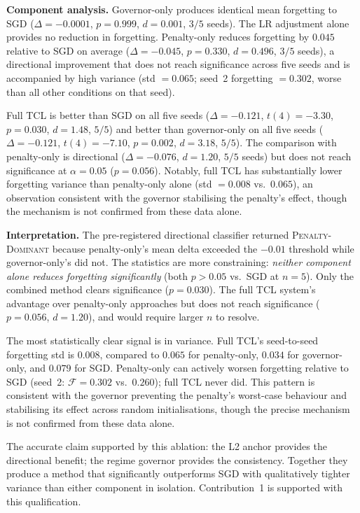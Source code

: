 \textbf{Component analysis.}
Governor-only produces identical mean forgetting to SGD
($\Delta = -0.0001$, $p = 0.999$, $d = 0.001$, $3/5$ seeds).
The LR adjustment alone provides no reduction in forgetting.
Penalty-only reduces forgetting by $0.045$ relative to SGD on average
($\Delta = -0.045$, $p = 0.330$, $d = 0.496$, $3/5$ seeds), a directional
improvement that does not reach significance across five seeds and is
accompanied by high variance (std $= 0.065$; seed~2 forgetting $= 0.302$,
worse than all other conditions on that seed).

Full TCL is better than SGD on all five seeds
($\Delta = -0.121$, $t(4) = -3.30$, $p = 0.030$, $d = 1.48$, $5/5$)
and better than governor-only on all five seeds
($\Delta = -0.121$, $t(4) = -7.10$, $p = 0.002$, $d = 3.18$, $5/5$).
The comparison with penalty-only is directional ($\Delta = -0.076$, $d = 1.20$,
$5/5$ seeds) but does not reach significance at $\alpha = 0.05$ ($p = 0.056$).
Notably, full TCL has substantially lower forgetting variance than penalty-only
alone (std $= 0.008$ vs.\ $0.065$), an observation consistent with the governor
stabilising the penalty's effect, though the mechanism is not confirmed from
these data alone.

\textbf{Interpretation.}
The pre-registered directional classifier returned \textsc{Penalty-Dominant}
because penalty-only's mean delta exceeded the $-0.01$ threshold while
governor-only's did not.
The statistics are more constraining: \emph{neither component alone reduces
forgetting significantly} (both $p > 0.05$ vs.\ SGD at $n = 5$).
Only the combined method clears significance ($p = 0.030$).
The full TCL system's advantage over penalty-only approaches but does not
reach significance ($p = 0.056$, $d = 1.20$), and would require larger $n$
to resolve.

The most statistically clear signal is in variance.
Full TCL's seed-to-seed forgetting std is $0.008$, compared to $0.065$
for penalty-only, $0.034$ for governor-only, and $0.079$ for SGD.
Penalty-only can actively worsen forgetting relative to SGD
(seed~2: $\mathcal{F} = 0.302$ vs.\ $0.260$); full TCL never did.
This pattern is consistent with the governor preventing the penalty's
worst-case behaviour and stabilising its effect across random initialisations,
though the precise mechanism is not confirmed from these data alone.

The accurate claim supported by this ablation: the L2 anchor provides the
directional benefit; the regime governor provides the consistency.
Together they produce a method that significantly outperforms SGD with
qualitatively tighter variance than either component in isolation.
Contribution~1 is supported with this qualification.
